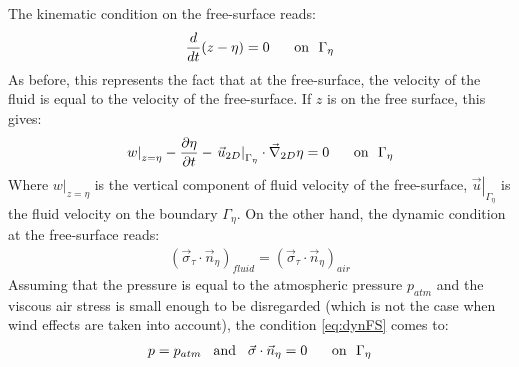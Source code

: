 The kinematic condition on the free-surface reads:
\begin{align}
  \dfrac{d}{dt}(z-\eta)=0 \hspace{0.5cm}\text{ on ~}\Gamma_\eta
\end{align}
As before, this represents the fact that at the free-surface, the velocity of the fluid is equal to the velocity of the free-surface.
If $z$ is on the free surface, this gives:
\begin{align}
  \left.w\right\rvert_{z=\eta} - \dfrac{\partial\eta}{\partial t} - \left.\vec{u}_{2D}\right\rvert_{\Gamma_\eta}\cdot\vec \nabla_{2D}\eta = 0 \hspace{0.5cm}\text{ on ~}\Gamma_\eta
  \label{eq:FreeSurfaceBoundary}
\end{align}
Where $\left.w\right\rvert_{z=\eta}$ is the vertical component of fluid velocity of the free-surface,
$\left.\vec{u}\right\rvert_{\Gamma_\eta}$ is the fluid velocity on the boundary $\Gamma_\eta$.
On the other hand, the dynamic condition at the free-surface reads:
\begin{align}
  (\vec{\sigma}_\tau \cdot\vec{n}_\eta)_{fluid} = (\vec{\sigma}_\tau \cdot\vec{n}_\eta)_{air}
  \label{eq:dynFS}
\end{align}
Assuming that the pressure is equal to the atmospheric pressure $p_{atm}$ and the viscous air
stress is small enough to be disregarded (which is not the case when wind effects are taken into account),
the condition \eqref{eq:dynFS} comes to:
\begin{align}
  p = p_{atm} \hspace{0.3cm}\text{and}\hspace{0.3cm} \vec{\sigma}\cdot\vec{n}_\eta = 0 \hspace{0.5cm}\text{ on ~}\Gamma_\eta
\end{align}

